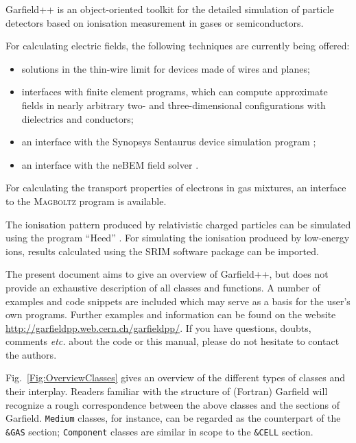 Garfield++ is an object-oriented toolkit for the detailed simulation of 
particle detectors based on ionisation measurement in 
gases or semiconductors.

For calculating electric fields, the following techniques are currently
being offered:
\begin{itemize}
  \item
  solutions in the thin-wire limit for devices made of wires and planes;
  \item
  interfaces with finite element programs, 
  which can compute approximate fields in nearly arbitrary 
  two- and three-dimensional configurations 
  with dielectrics and conductors;
  \item
  an interface with the Synopsys Sentaurus device simulation program
  \cite{Synopsys};
  \item
  an interface with the neBEM field solver 
  \cite{Mukhopadhyay2007,Mukhopadhyay2006}.
\end{itemize}

For calculating the transport properties of electrons in gas 
mixtures, an interface to the \textsc{Magboltz} program 
\cite{BiagiMagboltz,Biagi1999} is available. 

The ionisation pattern produced by relativistic charged particles 
can be simulated using the program ``Heed'' \cite{Smirnov2005}.
For simulating the ionisation produced by low-energy ions, 
results calculated using the SRIM software package \cite{Ziegler1985} 
can be imported.

The present document aims to give an overview of Garfield++, 
but does not provide an exhaustive 
description of all classes and functions.
A number of examples and code snippets are included 
which may serve as a basis for the user's own programs. 
Further examples and information can be found on the website 
\url{http://garfieldpp.web.cern.ch/garfieldpp/}.
If you have questions, doubts, comments \textit{etc.} about the code 
or this manual, please do not hesitate to contact the authors.
 

Fig.~\ref{Fig:OverviewClasses} gives an overview of the different types 
of classes and their interplay. 
Readers familiar with the structure 
of (Fortran) Garfield \cite{GarfieldFortran} will recognize a 
rough correspondence between 
the above classes and the sections of Garfield. 
\texttt{Medium} classes, for instance, can be regarded as the counterpart 
of the \texttt{\&GAS} section; 
\texttt{Component} classes are similar in 
scope to the \texttt{\&CELL} section.  
 
